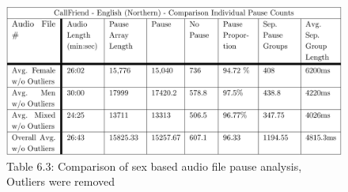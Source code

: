 \begin{figure}[h]
	\begin{center}
		\includegraphics[scale=0.35]{src/main-matter/results/experiment-sex/pause-analysis/comparison-pause-table}
		\caption{Table 6.3: Comparison of sex based audio file pause analysis, Outliers were removed}
		\label{female-10bins}
	\end{center}
\end{figure}



